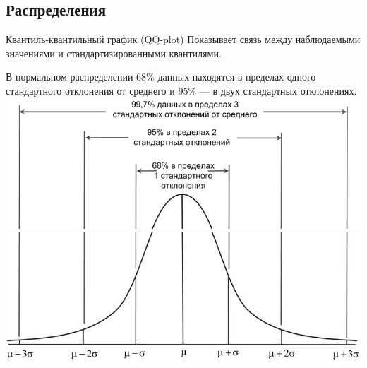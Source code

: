 \subsection{Распределения}
\begin{terms}
    \item[Квантиль-квантильный график (QQ-plot)] Показывает связь между наблюдаемыми значениями
    и стандартизированными квантилями. %
\end{terms}
В нормальном распределении 68\% данных находятся в пределах одного
стандартного отклонения от среднего и 95\% — в двух стандартных отклонениях.\\
\includegraphics[scale=0.5]{50 notions/img/norm_dist1}\\
\includegraphics[scale=0.5]{50 notions/img/norm_dist2}